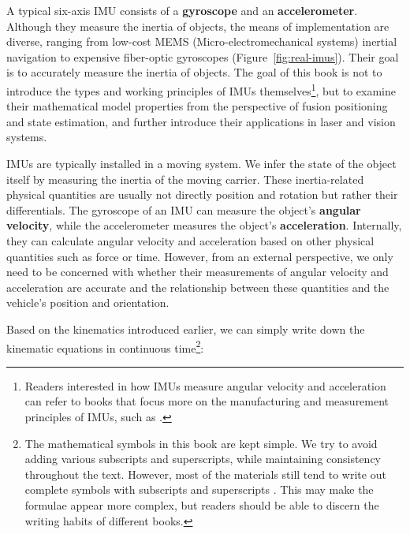 A typical six-axis IMU consists of a \textbf{gyroscope} and an \textbf{accelerometer}. Although they measure the inertia of objects, the means of implementation are diverse, ranging from low-cost MEMS (Micro-electromechanical systems) inertial navigation to expensive fiber-optic gyroscopes (Figure~\ref{fig:real-imus}). Their goal is to accurately measure the inertia of objects. The goal of this book is not to introduce the types and working principles of IMUs themselves\footnote{Readers interested in how IMUs measure angular velocity and acceleration can refer to books that focus more on the manufacturing and measurement principles of IMUs, such as \cite{Qin2014,Yan2019}.}, but to examine their mathematical model properties from the perspective of fusion positioning and state estimation, and further introduce their applications in laser and vision systems.

IMUs are typically installed in a moving system. We infer the state of the object itself by measuring the inertia of the moving carrier. These inertia-related physical quantities are usually not directly position and rotation but rather their differentials. The gyroscope of an IMU can measure the object's \textbf{angular velocity}, while the accelerometer measures the object's \textbf{acceleration}. Internally, they can calculate angular velocity and acceleration based on other physical quantities such as force or time. However, from an external perspective, we only need to be concerned with whether their measurements of angular velocity and acceleration are accurate and the relationship between these quantities and the vehicle's position and orientation.

Based on the kinematics introduced earlier, we can simply write down the kinematic equations in continuous time\footnote{The mathematical symbols in this book are kept simple. We try to avoid adding various subscripts and superscripts, while maintaining consistency throughout the text. However, most of the materials still tend to write out complete symbols with subscripts and superscripts \cite{Huai2018}. This may make the formulae appear more complex, but readers should be able to discern the writing habits of different books.}:

